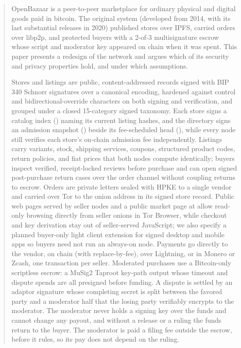 \begin{abstract}
OpenBazaar is a peer-to-peer marketplace for ordinary physical and digital goods paid in bitcoin. The original system (developed from 2014, with its last substantial releases in 2020) published stores over IPFS, carried orders over libp2p, and protected buyers with a 2-of-3 multisignature escrow whose script and moderator key appeared on chain when it was spent. This paper presents a redesign of the network and argues which of its security and privacy properties hold, and under which assumptions.

Stores and listings are public, content-addressed records signed with BIP 340 Schnorr signatures over a canonical encoding, hardened against control and bidirectional-override characters on both signing and verification, and grouped under a closed 15-category signed taxonomy. Each store signs a catalog index () naming its current listing hashes, and the directory signs an admission snapshot () beside its fee-scheduled head (), while every node still verifies each store's on-chain admission fee independently. Listings carry variants, stock, shipping services, coupons, structured product codes, return policies, and fiat prices that both nodes compute identically; buyers inspect verified, receipt-locked reviews before purchase and can open signed post-purchase return cases over the order channel without coupling returns to escrow. Orders are private letters sealed with HPKE to a single vendor and carried over Tor to the onion address in its signed store record. Public web pages served by seller nodes and a public market page at \code{/} allow read-only browsing directly from seller onions in Tor Browser, while checkout and key derivation stay out of seller-served JavaScript; we also specify a planned buyer-only light client extension for signed desktop and mobile apps so buyers need not run an always-on node. Payments go directly to the vendor, on chain (with replace-by-fee), over Lightning, or in Monero or Zcash, one transaction per seller. Moderated purchases use a Bitcoin-only scriptless escrow: a MuSig2 Taproot key-path output whose timeout and dispute spends are all presigned before funding. A dispute is settled by an adaptor signature whose completing secret is split between the favored party and a moderator half that the losing party verifiably encrypts to the moderator. The moderator never holds a signing key over the funds and cannot change any payout, and without a release or a ruling the funds return to the buyer. The moderator is paid a filing fee outside the escrow, before it rules, so its pay does not depend on the ruling.


\end{abstract}
